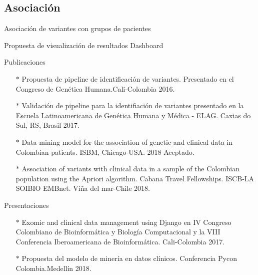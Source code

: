 \documentclass[xcolor=dvipsnames]{beamer}
\begin{document}
\subsection{Asociación}
\begin{frame}{Asociación de variantes con grupos de pacientes}
\end{frame}



\begin{frame}{Propuesta de visualización de resultados}
Dashboard
\end{frame}

\begin{frame}{Publicaciones}
\begin{itemize}
\justifying
	\item[$*$] Propuesta de pipeline de identificación de variantes. Presentado en el Congreso de Genética Humana.Cali-Colombia 2016.
	\item[$*$] Validación de pipeline para la identifiación de variantes presentado en la Escuela Latinoamericana de Genética Humana y Médica - ELAG. Caxias do Sul, RS, Brasil 2017.
	\item[$*$] Data mining model for the association of genetic and clinical data in Colombian patients.  ISBM, Chicago-USA. 2018 Aceptado. 
	\item[$*$] Association of variants with clinical data in a sample of the Colombian population using the Apriori algorithm. Cabana Travel Fellowships. ISCB-LA SOIBIO EMBnet. Viña del mar-Chile 2018. 
\end{itemize}
\end{frame}

\begin{frame}{Presentaciones}
\begin{itemize}
\justifying
    \item[$*$] Exomic and clinical data management using Django en IV Congreso Colombiano de Bioinformática y Biología Computacional y la VIII Conferencia Iberoamericana de Bioinformática. Cali-Colombia 2017.
	\item[$*$] Propuesta del  modelo de minería en datos clínicos. Conferencia Pycon Colombia.Medellín 2018.

\end{itemize}
\end{frame}
\end{document}
